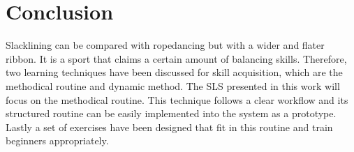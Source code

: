 \section{Conclusion}
Slacklining can be compared with ropedancing but with a wider and flater ribbon.
It is a sport that claims a certain amount of balancing skills.
Therefore, two learning techniques have been discussed for skill acquisition, which are the methodical routine and dynamic method.
The SLS presented in this work will focus on the methodical routine.
This technique follows a clear workflow and its structured routine can be easily implemented into the system as a prototype.
Lastly a set of exercises have been designed that fit in this routine and train beginners appropriately.
